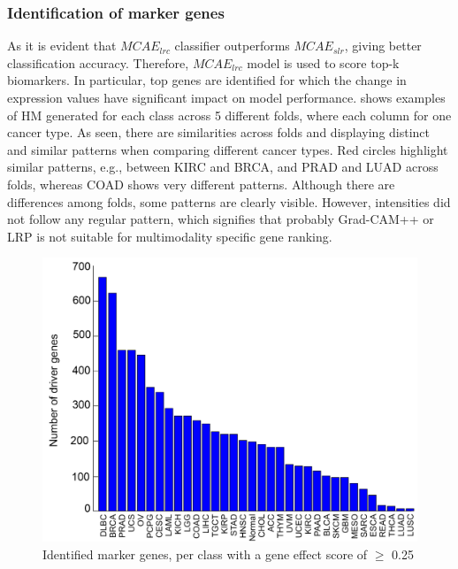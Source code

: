 \subsubsection{Identification of marker genes}
As it is evident that $MCAE_{lrc}$ classifier outperforms $MCAE_{slr}$, giving better classification accuracy. Therefore, $MCAE_{lrc}$ model is used to score top-k biomarkers. In particular, top genes are identified for which the change in expression values have significant impact on model performance.  shows examples of HM generated for each class across 5 different folds, where each column for one cancer type. As seen, there are similarities across folds and displaying distinct and similar patterns when comparing different cancer types. Red circles highlight similar patterns, e.g., between KIRC and BRCA, and PRAD and LUAD across folds, whereas COAD shows very different patterns. Although there are differences among folds, some patterns are clearly visible. However, intensities did not follow any regular pattern, which signifies that probably Grad-CAM++ or LRP is not suitable for multimodality specific gene ranking. 

\begin{figure}[h]
    \centering
	\includegraphics[scale=0.8]{images/driver_genes.png}
	\caption{Identified marker genes, per class with a gene effect score of $\geq$ 0.25}
    \label{fig:dg_cnn}
\end{figure}

